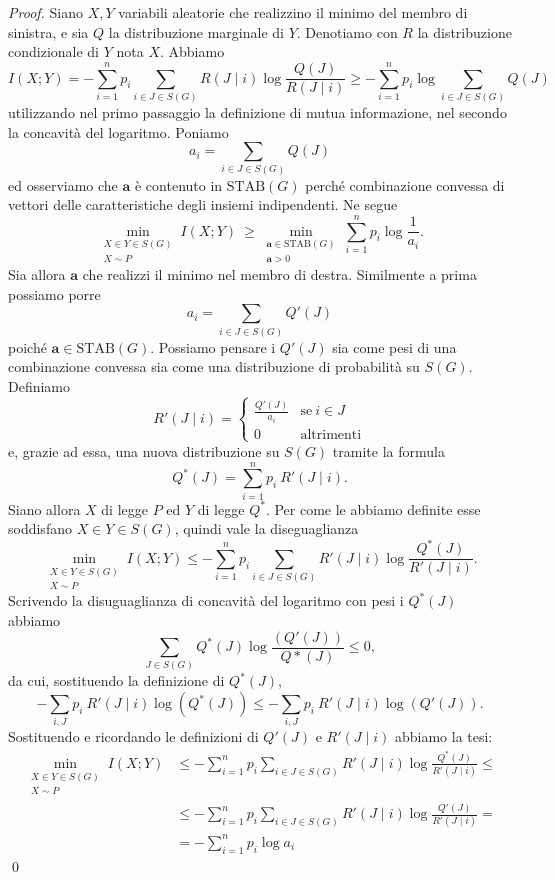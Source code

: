 \begin{proof}
	Siano \(X,Y\) variabili aleatorie che realizzino il minimo del membro di sinistra, e sia \(Q\) la distribuzione marginale di \(Y\). Denotiamo con \(R\) la distribuzione condizionale di \(Y\) nota \(X\). Abbiamo
	\[I(X;Y)=-\sum_{i=1}^n p_i\sum_{i\in J\in S(G)} R(J\mid i)\log{\frac{Q(J)}{R(J\mid i)}}\ge -\sum_{i=1}^n p_i \log{\sum_{i\in J\in S(G)}} Q(J)\]
	utilizzando nel primo passaggio la definizione di mutua informazione, nel secondo la concavità del logaritmo. Poniamo
	\[a_i=\sum_{i\in J\in S(G)} Q(J)\]
	ed osserviamo che \(\mathbf{a}\) è contenuto in \(\text{STAB}(G)\) perché combinazione convessa di vettori delle caratteristiche degli insiemi indipendenti. Ne segue
	\[\min_{\substack{X\in Y\in S(G) \\
	X\sim P}} I(X;Y)\ \ge \min_{\substack{\mathbf{a}\in \text{STAB}(G) \\
	\mathbf{a}>0}} \sum_{i=1}^n p_i\log{\frac{1}{a_i}}.\]
	Sia allora \(\mathbf{a}\) che realizzi il minimo nel membro di destra. Similmente a prima possiamo porre
	\[a_i=\sum_{i\in J\in S(G)} Q'(J)\]
	poiché \(\mathbf{a}\in \text{STAB}(G)\). Possiamo pensare i \(Q'(J)\) sia come pesi di una combinazione convessa sia come una distribuzione di probabilità su \(S(G)\). Definiamo
	\[R'(J\mid i)= 
	\begin{cases}
		\frac{Q'(J)}{a_i} & \text{se}\ i\in J\\
		0 & \text{altrimenti} 
	\end{cases}
	\]
	e, grazie ad essa, una nuova distribuzione su \(S(G)\) tramite la formula
	\[Q^*(J)=\sum_{i=1}^n p_i\ R'(J\mid i).\]
	Siano allora \(X\) di legge \(P\) ed \(Y\) di legge \(Q^*\). Per come le abbiamo definite esse soddisfano \(X\in Y\in S(G)\), quindi vale la diseguaglianza
	\[\min_{\substack{X\in Y\in S(G) \\
	X\sim P}} I(X;Y)\le -\sum_{i=1}^n p_i\sum_{i\in J\in S(G)} R'(J\mid i)\log{\frac{Q^*(J)}{R'(J\mid i)}}.\]
	Scrivendo la disuguaglianza di concavità del logaritmo con pesi i \(Q^*(J)\) abbiamo
	\[\sum_{J\in S(G)} Q^*(J)\log{\frac{(Q'(J))}{Q*(J)}} \le 0,\]
	da cui, sostituendo la definizione di \(Q^*(J)\),
	\[-\sum_{i,J} p_i\ R'(J\mid i)\log(Q^*(J))\le -\sum_{i,J} p_i\ R'(J\mid i)\log(Q'(J)).\]
	Sostituendo e ricordando le definizioni di \(Q'(J)\) e \(R'(J\mid i)\) abbiamo la tesi: 
	\begin{align}
		\min_{\substack{X\in Y\in S(G) \\
		X\sim P}} I(X;Y)&\le -\sum_{i=1}^n p_i\sum_{i\in J\in S(G)} R'(J\mid i)\log{\frac{Q^*(J)}{R'(J\mid i)}}\le \nonumber \\
		&\le -\sum_{i=1}^n p_i\sum_{i\in J\in S(G)} R'(J\mid i)\log{\frac{Q'(J)}{R'(J\mid i)}}= \nonumber \\
		&= -\sum_{i=1}^n p_i\log{a_i} \nonumber 
	\end{align}
	\qed 
\end{proof}

